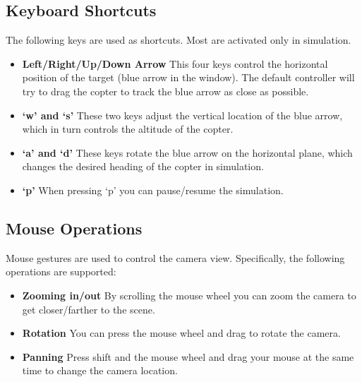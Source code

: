 \subsection{Keyboard Shortcuts}
The following keys are used as shortcuts. Most are activated only in simulation.
\begin{itemize}
  \item \textbf{Left/Right/Up/Down Arrow} This four keys control the horizontal position of the target (blue arrow in the window). The default controller will try to drag the copter to track the blue arrow as close as possible.

  \item \textbf{`w' and `s'} These two keys adjust the vertical location of the blue arrow, which in turn controls the altitude of the copter.

  \item \textbf{`a' and `d'} These keys rotate the blue arrow on the horizontal plane, which changes the desired heading of the copter in simulation.

  \item \textbf{`p'} When pressing `p' you can pause/resume the simulation.
\end{itemize}

\subsection{Mouse Operations}
Mouse gestures are used to control the camera view. Specifically, the following operations are supported:
\begin{itemize}
  \item \textbf{Zooming in/out} By scrolling the mouse wheel you can zoom the camera to get closer/farther to the scene.

  \item \textbf{Rotation} You can press the mouse wheel and drag to rotate the camera.

  \item \textbf{Panning} Press shift and the mouse wheel and drag your mouse at the same time to change the camera location.
\end{itemize}
